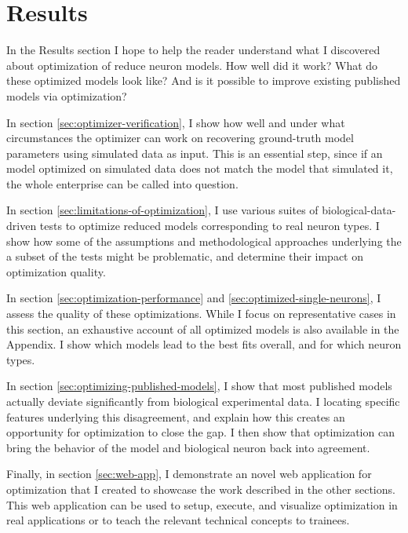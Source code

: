 \chapter{Results}
In the Results section I hope to help the reader understand what I discovered about optimization of reduce neuron models.
How well did it work?
What do these optimized models look like?
And is it possible to improve existing published models via optimization?

In section \ref{sec:optimizer-verification}, I show how well and under what circumstances the optimizer can work on recovering ground-truth model parameters using simulated data as input.
This is an essential step, since if an model optimized on simulated data does not match the model that simulated it, the whole enterprise can be called into question.

In section \ref{sec:limitations-of-optimization}, I use various suites of biological-data-driven tests to optimize reduced models corresponding to real neuron types.
I show how some of the assumptions and methodological approaches underlying the a subset of the tests might be problematic, and determine their impact on optimization quality. 

In section \ref{sec:optimization-performance} and \ref{sec:optimized-single-neurons}, I assess the quality of these optimizations. 
While I focus on representative cases in this section, an exhaustive account of all optimized models is also available in the Appendix.
I show which models lead to the best fits overall, and for which neuron types.

In section \ref{sec:optimizing-published-models}, I show that most published models actually deviate significantly from biological experimental data.
I locating specific features underlying this disagreement, and explain how this creates an opportunity for optimization to close the gap.
I then show that optimization can bring the behavior of the model and biological neuron back into agreement.

Finally, in section \ref{sec:web-app}, I demonstrate an novel web application for optimization that I created to showcase the work described in the other sections.
This web application can be used to setup, execute, and visualize optimization in real applications or to teach the relevant technical concepts to trainees.


 


 






